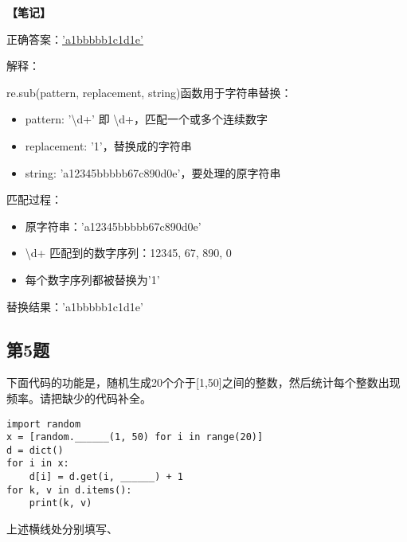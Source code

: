 \begin{mdframed}[linewidth=1pt, linecolor=black]

  \textbf{\color{red}【笔记】}

  正确答案：\underline{'a1bbbbb1c1d1e'}

  解释：

  \qquad re.sub(pattern, replacement, string)函数用于字符串替换：
  \begin{itemize}
    \item pattern: '\textbackslash d+' 即 \textbackslash d+，匹配一个或多个连续数字
    \item replacement: '1'，替换成的字符串
    \item string: 'a12345bbbbb67c890d0e'，要处理的原字符串
  \end{itemize}

  \qquad 匹配过程：
  \begin{itemize}
    \item 原字符串：'a12345bbbbb67c890d0e'
    \item \textbackslash d+ 匹配到的数字序列：12345, 67, 890, 0
    \item 每个数字序列都被替换为'1'
  \end{itemize}

  \qquad 替换结果：'a1bbbbb1c1d1e'

\end{mdframed}

\subsection{第5题}
下面代码的功能是，随机生成20个介于[1,50]之间的整数，然后统计每个整数出现频率。请把缺少的代码补全。
\begin{lstlisting}
import random
x = [random.______(1, 50) for i in range(20)]
d = dict()
for i in x:
    d[i] = d.get(i, ______) + 1
for k, v in d.items():
    print(k, v)
\end{lstlisting}
上述横线处分别填写\underline{\hspace{3cm}}、\underline{\hspace{3cm}}

